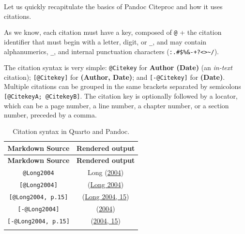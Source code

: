 \documentclass[
  12pt,
  a4paper,
  oneside,
  numbers=noenddot,
  titlepage,
  toclink=all,
  toc=bibliography]{scrbook}
\theoremstyle{definition}
\theoremstyle{definition}
\theoremstyle{definition}
\theoremstyle{plain}
\theoremstyle{plain}
\theoremstyle{plain}
\theoremstyle{plain}
\theoremstyle{plain}
\theoremstyle{remark}
\begin{document}
Let us quickly recapitulate the basics of Pandoc Citeproc and how it
uses citations.

\begin{tcolorbox}[enhanced jigsaw, titlerule=0mm, left=2mm, toptitle=1mm, colback=white, coltitle=black, rightrule=.15mm, arc=.35mm, title=\textcolor{quarto-callout-note-color}{\faInfo}\hspace{0.5em}{Citekeys}, colframe=quarto-callout-note-color-frame, bottomrule=.15mm, colbacktitle=quarto-callout-note-color!10!white, toprule=.15mm, breakable, bottomtitle=1mm, opacityback=0, opacitybacktitle=0.6, leftrule=.75mm]

As we know, each citation must have a key, composed of \texttt{@} + the
citation identifier that must begin with a letter, digit, or
\texttt{\_}, and may contain alphanumerics, \texttt{\_}, and internal
punctuation characters
(\texttt{:.\#\$\%\&-+?\textless{}\textgreater{}\textasciitilde{}/}).

\end{tcolorbox}

The citation syntax is very simple: \texttt{@Citekey} for \textbf{Author
(Date)} (an \emph{in-text} citation); \texttt{{[}@Citekey{]}} for
\textbf{(Author, Date)}; and \texttt{{[}-@Citekey{]}} for
\textbf{(Date)}. Multiple citations can be grouped in the same brackets
separated by semicolons \texttt{{[}@CitekeyA;\ @CitekeyB{]}}. The
citation key is optionally followed by a locator, which can be a page
number, a line number, a chapter number, or a section number, preceded
by a comma.

\hypertarget{tbl-scriv43}{}
\begin{longtable}[]{@{}cc@{}}
\toprule\noalign{}
\textbf{Markdown Source} & \textbf{Rendered output} \\
\midrule\noalign{}
\endfirsthead
\toprule\noalign{}
\textbf{Markdown Source} & \textbf{Rendered output} \\
\midrule\noalign{}
\endhead
\bottomrule\noalign{}
\endlastfoot
\texttt{@Long2004} & \protect\hypertarget{cite_95}{}{\label{cite_95}Long
(\protect\hyperlink{ref-Long2004}{2004})} \\
\texttt{{[}@Long2004{]}} &
\protect\hypertarget{cite_96}{}{\label{cite_96}(\protect\hyperlink{ref-Long2004}{Long
2004})} \\
\texttt{{[}@Long2004,\ p.15{]}} &
\protect\hypertarget{cite_97}{}{\label{cite_97}(\protect\hyperlink{ref-Long2004}{Long
2004, 15})} \\
\texttt{{[}-@Long2004{]}} &
\protect\hypertarget{cite_98}{}{\label{cite_98}(\protect\hyperlink{ref-Long2004}{2004})} \\
\texttt{{[}-@Long2004,\ p.15{]}} &
\protect\hypertarget{cite_99}{}{\label{cite_99}(\protect\hyperlink{ref-Long2004}{2004,
15})} \\
\caption{\label{tbl-scriv43}Citation syntax in Quarto and
Pandoc.}\tabularnewline
\end{longtable}
\end{document}
